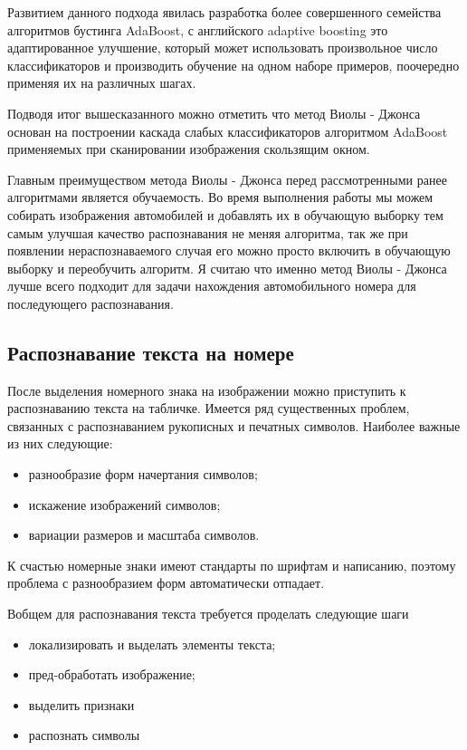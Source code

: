 Развитием данного подхода явилась разработка более совершенного семейства алгоритмов бустинга AdaBoost, с английского adaptive boosting это адаптированное улучшение, который может использовать произвольное число классификаторов и производить обучение на одном наборе примеров, поочередно применяя их на различных шагах.

Подводя итог вышесказанного можно отметить что метод Виолы - Джонса основан на построении каскада слабых классификаторов алгоритмом AdaBoost применяемых при сканировании изображения скользящим окном.

Главным преимуществом метода Виолы - Джонса перед рассмотренными ранее алгоритмами является обучаемость. Во время выполнения работы мы можем собирать изображения автомобилей и добавлять их в обучающую выборку тем самым улучшая качество распознавания не меняя алгоритма, так же при появлении нераспознаваемого случая его можно просто включить в обучающую выборку и переобучить алгоритм. Я считаю что именно метод Виолы - Джонса лучше всего подходит для задачи нахождения автомобильного номера для последующего распознавания.

\subsection{Распознавание текста на номере}
\label{sub:domain:recognition}

После выделения номерного знака на изображении можно приступить к распознаванию текста на табличке. 
Имеется ряд существенных проблем, связанных с распознаванием рукописных и печатных символов. Наиболее важные из них следующие:
\begin{itemize}
  \item разнообразие форм начертания символов;
  \item искажение изображений символов;
  \item вариации размеров и масштаба символов.
\end{itemize}
К счастью номерные знаки имеют стандарты по шрифтам и написанию, поэтому проблема с разнообразием форм автоматически отпадает.

Вобщем для распознавания текста требуется проделать следующие шаги
\begin{itemize}
  \item локализировать и выделать элементы текста;
  \item пред-обработать изображение;
  \item выделить признаки
  \item распознать символы
\end{itemize}

